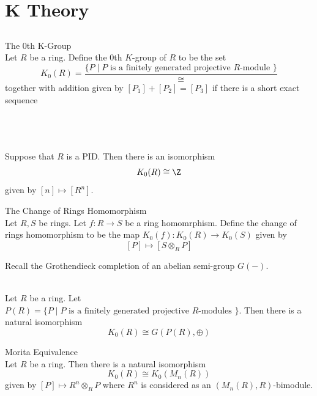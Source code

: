\documentclass[a4paper]{article}
\begin{document}
\pagebreak
\section{K Theory}
\subsection{}
\begin{defn}{The 0th K-Group}{}\\
Let $R$ be a ring. Define the $0$th $K$-group of $R$ to be the set $$K_0(R)=\frac{\{P\;|\;P\text{ is a finitely generated projective }R\text{-module }\}}{\cong}$$ together with addition given by $[P_1]+[P_2]=[P_3]$ if there is a short exact sequence \\
\\~\\
\end{defn}

\begin{eg}{}{}\\
Suppose that $R$ is a PID. Then there is an isomorphism $$K_0(R)\cong\Z$$ given by $[n]\mapsto[R^n]$. 
\end{eg}

\begin{defn}{The Change of Rings Homomorphism}{}\\
Let $R,S$ be rings. Let $f:R\to S$ be a ring homomrphism. Define the change of rings homomorphism to be the map $K_0(f):K_0(R)\to K_0(S)$ given by $$[P]\mapsto[S\otimes_RP]$$
\end{defn}

Recall the Grothendieck completion of an abelian semi-group $G(-)$. 

\begin{prp}{}{}\\
Let $R$ be a ring. Let $P(R)=\{P\;|\;P\text{ is a finitely generated projective }R\text{-modules }\}$. Then there is a natural isomorphism $$K_0(R)\cong G(P(R),\oplus)$$
\end{prp}

\begin{prp}{Morita Equivalence}{}\\
Let $R$ be a ring. Then there is a natural isomorphism $$K_0(R)\cong K_0(M_n(R))$$ given by $[P]\mapsto R^n\otimes_RP$ where $R^n$ is considered as an $(M_n(R),R)$-bimodule. 
\end{prp}
\end{document}

